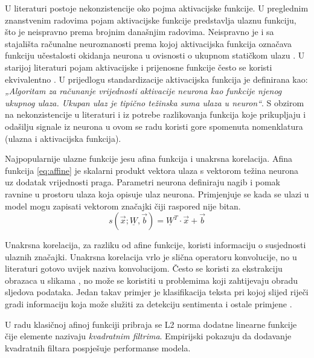 \documentclass[times, utf8, numeric, diplomski]{fer}
\def\mat#1{\underline{#1}}
\begin{document}
U literaturi postoje nekonzistencije oko pojma aktivacijske funkcije. U preglednim znanstvenim radovima \citep{function_survey1, function_survey2, function_survey3} pojam aktivacijske funkcije predstavlja ulaznu funkciju, što je neispravno prema brojnim današnjim radovima. Neispravno je i sa stajališta računalne neuroznanosti prema kojoj aktivacijska funkcija označava funkciju učestalosti okidanja neurona u ovisnosti o ukupnom statičkom ulazu \citep[str.~234]{neuroscience}. U starijoj literaturi pojam aktivacijske i prijenosne funkcije često se koristi ekvivalentno \citep{evolving_transfer, evo_parsimonious}. U prijedlogu standardizacije \citet{ieee_standardization} aktivacijska funkcija je definirana kao: \textit{„Algoritam za računanje vrijednosti aktivacije neurona kao funkcije njenog ukupnog ulaza. Ukupan ulaz je tipično težinska suma ulaza u neuron“}. S obzirom na nekonzistencije u literaturi i iz potrebe razlikovanja funkcija koje prikupljaju i odašilju signale iz neurona u ovom se radu koristi gore spomenuta nomenklatura (ulazna i aktivacijska funkcija).

Najpopularnije ulazne funkcije jesu afina funkcija i unakrsna korelacija.
Afina funkcija \eqref{eq:affine} je skalarni produkt vektora ulaza s vektorom težina neurona uz dodatak vrijednosti praga. Parametri neurona definiraju nagib i pomak ravnine u prostoru ulaza koja opisuje ulaz neurona. Primjenjuje se kada se ulazi u model mogu zapisati vektorom značajki čiji raspored nije bitan.
\begin{equation}
\label{eq:affine}
s(\vec{x};\mat{W},\vec{b})=\mat{W}^T \cdot \vec{x} + \vec{b}
\end{equation}

Unakrsna korelacija, za razliku od afine funkcije, koristi informaciju o susjednosti ulaznih značajki. Unakrsna korelacija vrlo je slična operatoru konvolucije, no u literaturi gotovo uvijek naziva konvolucijom. Često se koristi za ekstrakciju obrazaca u slikama \citep{alexnet}, no može se koristiti u problemima koji zahtijevaju obradu sljedova podataka. Jedan takav primjer je klasifikacija teksta pri kojoj slijed riječi gradi informaciju koja može služiti za detekciju sentimenta i ostale primjene \citep{char_cnn}.

U radu \citet{softsign} klasičnoj afinoj funkciji pribraja se L2 norma dodatne linearne funkcije čije elemente nazivaju \textit{kvadratnim filtrima}. Empirijski pokazuju da dodavanje kvadratnih filtara pospješuje performanse modela.
\end{document}
